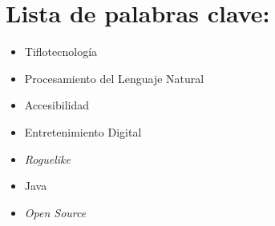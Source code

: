 \section*{Lista de palabras clave:}

\begin{itemize}
  \item Tiflotecnología
  \item Procesamiento del Lenguaje Natural
  \item Accesibilidad
  \item Entretenimiento Digital
  \item \textit{Roguelike}
  \item Java
  \item \textit{Open Source}
\end{itemize}
